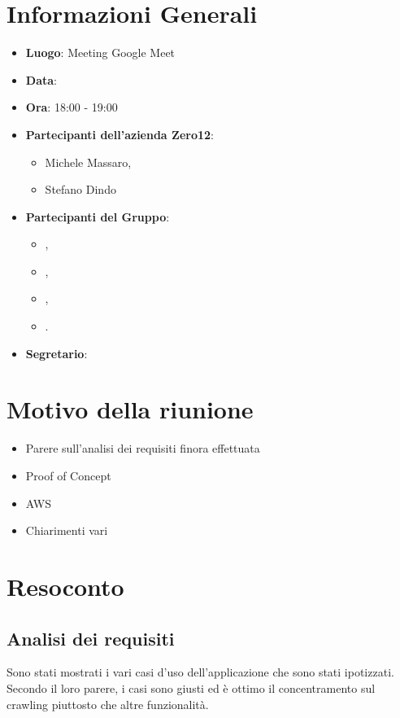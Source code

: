\section{Informazioni Generali}

\begin{itemize}
\item{\textbf{Luogo}}: Meeting Google Meet
\item{\textbf{Data}}: \D{}
\item{\textbf{Ora}}: 18:00 - 19:00
\item{\textbf{Partecipanti dell'azienda Zero12}}: 
	\begin{itemize}
	\item{Michele Massaro,} 
	\item{Stefano Dindo}
	\end{itemize} 
\item{\textbf{Partecipanti del Gruppo}}: 
	\begin{itemize}
	\item{\EP{},} 
	\item{\GC{},}
	\item{\MB{},}
	\item{\PV{}.}
	\end{itemize} 
\item{\textbf{Segretario}}: \PV{}	
\end{itemize}

\section{Motivo della riunione}
\begin{itemize}
\item{Parere sull'analisi dei requisiti finora effettuata}
\item{Proof of Concept}
\item{AWS}
\item{Chiarimenti vari}
\end{itemize}

\section{Resoconto}

\subsection{Analisi dei requisiti}

Sono stati mostrati i vari casi d'uso dell'applicazione che sono stati ipotizzati. Secondo il loro parere, i casi sono giusti ed è ottimo il concentramento sul crawling piuttosto che altre funzionalità.

